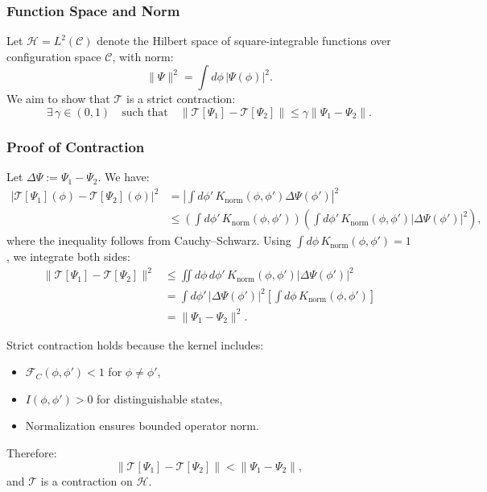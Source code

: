 \subsubsection*{Function Space and Norm}

Let \( \mathcal{H} = L^2(\mathcal{C}) \) denote the Hilbert space of square-integrable functions over configuration space \( \mathcal{C} \), with norm:
\begin{equation}
\| \Psi \|^2 = \int d\phi \, |\Psi(\phi)|^2.
\end{equation}
We aim to show that \( \mathcal{T} \) is a strict contraction:
\begin{equation}
\exists \, \gamma \in (0,1) \quad \text{such that} \quad \|\mathcal{T}[\Psi_1] - \mathcal{T}[\Psi_2]\| \leq \gamma \|\Psi_1 - \Psi_2\|.
\end{equation}

\subsubsection*{Proof of Contraction}

Let \( \Delta \Psi := \Psi_1 - \Psi_2 \). We have:
\begin{align}
\left| \mathcal{T}[\Psi_1](\phi) - \mathcal{T}[\Psi_2](\phi) \right|^2
&= \left| \int d\phi' \, K_{\text{norm}}(\phi, \phi') \Delta \Psi(\phi') \right|^2 \\
&\leq \left( \int d\phi' \, K_{\text{norm}}(\phi, \phi') \right)
\left( \int d\phi' \, K_{\text{norm}}(\phi, \phi') |\Delta \Psi(\phi')|^2 \right),
\end{align}
where the inequality follows from Cauchy--Schwarz. Using \( \int d\phi \, K_{\text{norm}}(\phi, \phi') = 1 \), we integrate both sides:
\begin{align}
\| \mathcal{T}[\Psi_1] - \mathcal{T}[\Psi_2] \|^2
&\leq \iint d\phi \, d\phi' \, K_{\text{norm}}(\phi, \phi') |\Delta \Psi(\phi')|^2 \\
&= \int d\phi' \, |\Delta \Psi(\phi')|^2 \left[ \int d\phi \, K_{\text{norm}}(\phi, \phi') \right] \\
&= \| \Psi_1 - \Psi_2 \|^2.
\end{align}

Strict contraction holds because the kernel includes:
\begin{itemize}
    \item \( \mathcal{F}_C(\phi, \phi') < 1 \) for \( \phi \ne \phi' \),
    \item \( I(\phi, \phi') > 0 \) for distinguishable states,
    \item Normalization ensures bounded operator norm.
\end{itemize}
Therefore:
\begin{equation}
\| \mathcal{T}[\Psi_1] - \mathcal{T}[\Psi_2] \| < \| \Psi_1 - \Psi_2 \|,
\end{equation}
and \( \mathcal{T} \) is a contraction on \( \mathcal{H} \).

